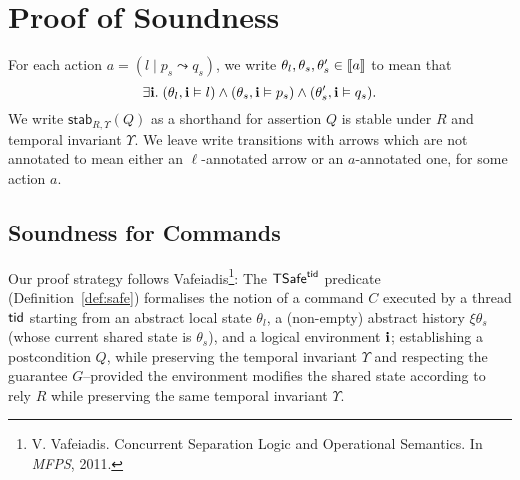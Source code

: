 
\newcommand{\consistent}[1]{(#1)\fdef}
\newcommand{\unit}{\epsilon}
\newcommand{\safecond}[1]{\noindent\textbf{\saferef{#1}}}
\newcommand{\saferef}[1]{Condition~(\ref{safe:#1})} %
\newcommand{\gsafecond}[1]{\noindent\textbf{\gsaferef{#1}}}
\newcommand{\gsaferef}[1]{Condition~(\ref{gsafe:#1})} %
\newcommand{\safeloccond}[1]{\noindent\textbf{\safelocref{#1}}}
\newcommand{\safelocref}[1]{Condition~(\ref{safeloc:#1})} %

\newcommand{\stable}[3]{\mathsf{stab}_{#2,#3}(#1)}

\newcommand{\sswa}[3]{\mathsf{sswa}_{#2,#3}(#1)}

\newcommand{\tvdash}{\vdash_\ltid}
\newcommand{\tvDash}{\vDash_\ltid}

 
\section{Proof of Soundness\label{app:soundness}}


For each action $a = (l \mid  p_s \leadsto q_s)$, 
we write $\theta_l,\theta_s,\theta_s' \in \llbracket a \rrbracket$ 
to mean that 
$$
\exists {\bf i}.\;
(\theta_l,{\bf i}\vDash l) \wedge
(\theta_s,{\bf i}\vDash p_s) \wedge
(\theta_s',{\bf i}\vDash q_s).
$$
We write $\stable{Q}{R}{\Upsilon}$ as a shorthand for assertion
$Q$ is stable under $R$ and temporal invariant $\Upsilon$.
We leave write transitions with arrows which are not annotated to mean either an $\ell$-annotated arrow or an $a$-annotated one, for some action $a$. 


\subsection{Soundness for Commands}


Our proof strategy follows  Vafeiadis\footnote{
V. Vafeiadis. Concurrent Separation Logic and Operational Semantics. In {\em
  MFPS}, 2011.}:
The ${\sf TSafe}^{{\sf tid}}$ predicate (Definition~\ref{def:safe}) formalises the notion of a command $C$ 
executed by a thread  ${\sf tid}$ 
starting from an abstract local state $\theta_l$,  
a (non-empty) abstract history $\xi\theta_s$ (whose current shared state is $\theta_s$),
and a logical environment ${\bf i}$; 
establishing a postcondition $Q$, while preserving the temporal invariant $\Upsilon$ and respecting the guarantee $G$--provided the environment modifies the shared state according to rely $R$ while preserving the same temporal invariant $\Upsilon$. 


